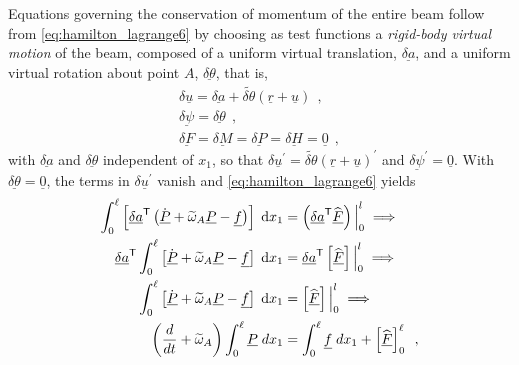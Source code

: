 \documentclass[12pt,a4paper,oneside,english]{abntex2} %
\newcommand{\fix}[1]{{\color{red}#1}}
\newcommand{\vect}[1]{\underline{#1}}
\def\til#1{\widetilde{#1}}
\def\lb{\left[}
\def\rb{\right]}
\def\lp{\left(}
\def\rp{\right)}
\def\T{\mathsf{T}}
\def\xo{x_1}
\def\r{\vect{r}}
\def\u{\vect{u}}
\def\uprime{\u^{\prime}}
\def\omAtil{\til{\omega}_A}
\def\P{\vect{P}}
\def\Pdot{\dot{\P}}
\def\F{\vect{F}}
\def\Fhat{\widehat{\F}}
\def\f{\vect{f}}
\def\delF{\vect{\delta F}}
\def\delM{\vect{\delta M}}
\def\delP{\vect{\delta P}}
\def\delH{\vect{\delta H}}
\def\delpsi{\vect{\delta\psi}}
\def\delpsip{\delpsi^{\prime}}
\def\zv{\vect{0}}
\def\intl{\int_{0}^{\ell}}
\def\d{\textnormal{d}}
\begin{document}
\fix{Equations governing the conservation of momentum of the entire beam follow from \cref{eq:hamilton_lagrange6} by choosing as test functions a \textit{rigid-body virtual motion} of the beam, composed of a uniform virtual translation, $\vect{\delta a}$, and a uniform virtual rotation about point $A$, $\vect{\delta\theta}$, that is,
\begin{equation}
    \begin{aligned}
        \delta\u = \vect{\delta a} + \til{\delta\theta}\lp\r+\u\rp \ \ ,
        \\
        \delpsi = \vect{\delta\theta} \ \ ,
        \\
        \delF = \delM = \delP = \delH = \zv \ \ ,
    \end{aligned}
    \label{eq:rigid_virtual_motion}
\end{equation}
with $\vect{\delta a}$ and $\vect{\delta\theta}$ independent of $\xo$, so that $\delta\uprime = \til{\delta\theta}\lp\r+\u\rp^\prime$ and $\delpsip = \zv$. With $\vect{\delta\theta}=\zv$, the terms in $\delta\uprime$ vanish and \cref{eq:hamilton_lagrange6} yields
\begin{align}
	\intl \lb \vect{\delta a}^\T \lp \Pdot + \omAtil\P - \f \rp 
	\rb \;\d\xo &= \lp \vect{\delta a}^\T \Fhat \rp\Big|_{0}^{l} \implies
    \nonumber \\
    \vect{\delta a}^\T \intl \lb \Pdot + \omAtil\P - \f \rb \;\d\xo &= \vect{\delta a}^\T \lb \Fhat \rb\Big|_{0}^{l} \implies
    \nonumber \\
    \intl \lb \Pdot + \omAtil\P - \f \rb \;\d\xo &= \lb\Fhat\rb\Big|_{0}^{l} \implies 
    \nonumber \\
    \lp \frac{d}{dt} + \omAtil \rp \int_0^\ell \P \; d\xo &= \int_0^\ell \f \; d\xo + \Big[\Fhat\Big]_0^\ell \ \ ,
    \label{eq:hamilton_lagrange_rigid_deltaa}
\end{align}

}
\end{document}
